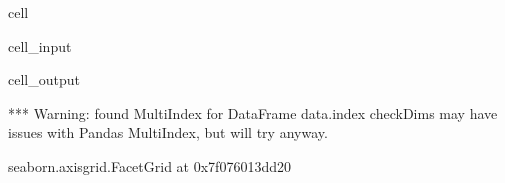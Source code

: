\documentclass[letterpaper,table,10pt,english]{jupyterBook}
\begin{document}
\begin{sphinxuseclass}{cell}\begin{sphinxVerbatimInput}

\begin{sphinxuseclass}{cell_input}
\begin{sphinxVerbatim}[commandchars=\\\{\}]
  
     
                 
                     
\end{sphinxVerbatim}

\end{sphinxuseclass}\end{sphinxVerbatimInput}
\begin{sphinxVerbatimOutput}

\begin{sphinxuseclass}{cell_output}
\begin{sphinxVerbatim}[commandchars=\\\{\}]
*** Warning: found MultiIndex for DataFrame data.index \PYGZhy{} checkDims may have issues with Pandas MultiIndex, but will try anyway.
\end{sphinxVerbatim}

\begin{sphinxVerbatim}[commandchars=\\\{\}]
\PYGZlt{}seaborn.axisgrid.FacetGrid at 0x7f076013dd20\PYGZgt{}
\end{sphinxVerbatim}

\noindent{}

\end{sphinxuseclass}\end{sphinxVerbatimOutput}

\end{sphinxuseclass}
\end{document}
